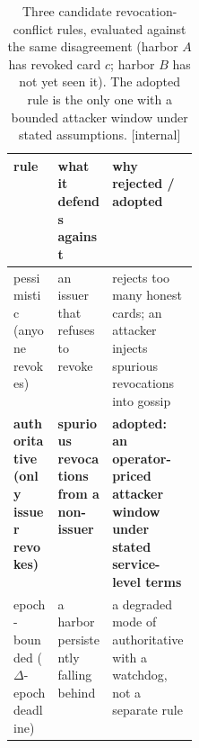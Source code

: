 %
\begin{table}[H]
\centering
\caption{Three candidate revocation-conflict rules, evaluated against the
same disagreement (harbor $A$ has revoked card $c$; harbor $B$ has not yet
seen it). The adopted rule is the only one with a bounded attacker window
under stated assumptions. [internal]}
\label{tab:fh-revocation-rules}
\small
\renewcommand{\arraystretch}{1.2}
\begin{tabularx}{\linewidth}{@{}>{\raggedright\arraybackslash}p{0.24\linewidth} >{\raggedright\arraybackslash}X >{\raggedright\arraybackslash}X@{}}
\toprule
\textbf{rule} & \textbf{what it defends against} & \textbf{why rejected / adopted} \\
\midrule
pessimistic (anyone revokes) & an issuer that refuses to revoke & rejects too many honest cards; an attacker injects spurious revocations into gossip \\
\textbf{authoritative (only issuer revokes)} & \textbf{spurious revocations from a non-issuer} & \textbf{adopted: an \mbox{operator-priced} attacker window under stated \mbox{service-level} terms} \\
epoch-bounded ($\Delta$-epoch deadline) & a harbor persistently falling behind & a degraded mode of authoritative with a watchdog, not a separate rule \\
\bottomrule
\end{tabularx}
\end{table}

